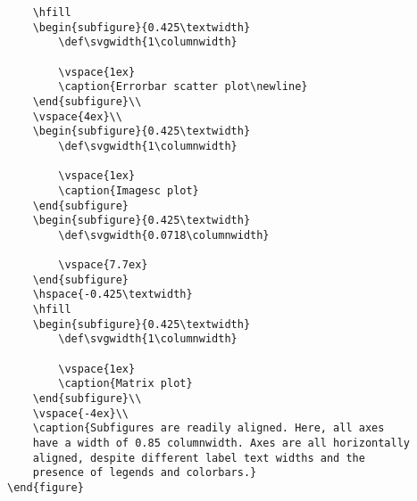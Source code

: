 \documentclass{article}
\begin{document}
\begin{verbatim}
    \hfill
    \begin{subfigure}{0.425\textwidth}
        \def\svgwidth{1\columnwidth}
        
        \vspace{1ex}
        \caption{Errorbar scatter plot\newline}
    \end{subfigure}\\
    \vspace{4ex}\\
    \begin{subfigure}{0.425\textwidth}
        \def\svgwidth{1\columnwidth}
        
        \vspace{1ex}
        \caption{Imagesc plot}
    \end{subfigure}
    \begin{subfigure}{0.425\textwidth}
        \def\svgwidth{0.0718\columnwidth}
        
        \vspace{7.7ex}
    \end{subfigure}
    \hspace{-0.425\textwidth}
    \hfill
    \begin{subfigure}{0.425\textwidth}
        \def\svgwidth{1\columnwidth}
        
        \vspace{1ex}
        \caption{Matrix plot}
    \end{subfigure}\\
    \vspace{-4ex}\\
    \caption{Subfigures are readily aligned. Here, all axes
    have a width of 0.85 columnwidth. Axes are all horizontally
    aligned, despite different label text widths and the 
    presence of legends and colorbars.}
\end{figure}
\end{verbatim}
\end{document}
